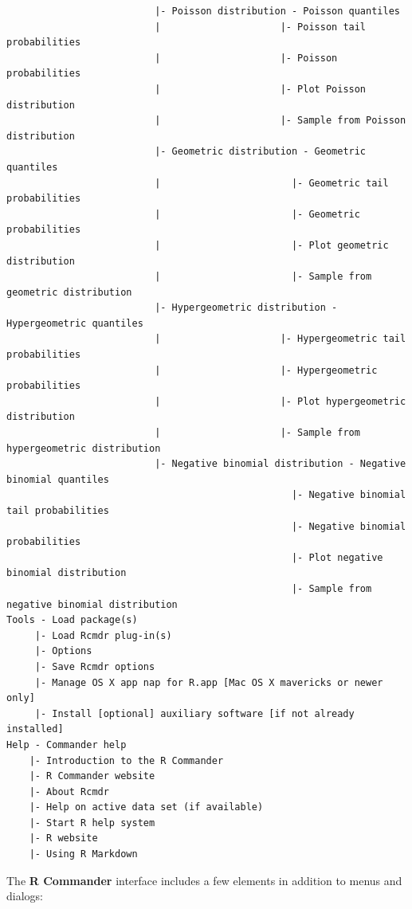 \documentclass{article}%
\begin{document}
\begin{verbatim}
                          |- Poisson distribution - Poisson quantiles
                          |                     |- Poisson tail probabilities
                          |                     |- Poisson probabilities
                          |                     |- Plot Poisson distribution
                          |                     |- Sample from Poisson distribution
                          |- Geometric distribution - Geometric quantiles
                          |                       |- Geometric tail probabilities
                          |                       |- Geometric probabilities
                          |                       |- Plot geometric distribution
                          |                       |- Sample from geometric distribution
                          |- Hypergeometric distribution - Hypergeometric quantiles
                          |                     |- Hypergeometric tail probabilities
                          |                     |- Hypergeometric probabilities
                          |                     |- Plot hypergeometric distribution
                          |                     |- Sample from hypergeometric distribution
                          |- Negative binomial distribution - Negative binomial quantiles
                                                  |- Negative binomial tail probabilities
                                                  |- Negative binomial probabilities
                                                  |- Plot negative binomial distribution
                                                  |- Sample from negative binomial distribution
Tools - Load package(s)
     |- Load Rcmdr plug-in(s)
     |- Options
     |- Save Rcmdr options
     |- Manage OS X app nap for R.app [Mac OS X mavericks or newer only]
     |- Install [optional] auxiliary software [if not already installed]
Help - Commander help
    |- Introduction to the R Commander
    |- R Commander website
    |- About Rcmdr
    |- Help on active data set (if available)
    |- Start R help system
    |- R website
    |- Using R Markdown
\end{verbatim}

The \textbf{R Commander} interface includes a few elements in addition to
menus and dialogs:
\end{document}
